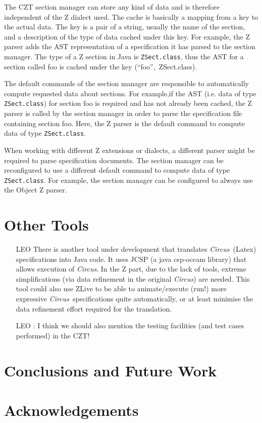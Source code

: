 \documentclass{llncs}
\newcommand{\Circus}{{\sf\slshape Circus}}
\newcommand{\Interface}[1]{\texttt{#1}}
\begin{document}
  The CZT section manager can store any kind of data and is therefore
  independent of the Z dialect used.  The cache is basically a mapping
  from a key to the actual data.  The key is a pair of a string,
  usually the name of the section, and a description of the type of
  data cached under this key.  For example, the Z parser adds the AST
  representation of a specification it has parsed to the section
  manager.  The type of a Z section in Java is
  \Interface{ZSect.class}, thus the AST for a section called foo is
  cached under the key (``foo'',~ZSect.class).

  The default commands of the section manager are responsible to
  automatically compute requested data about sections.  For example,if
  the AST (i.e. data of type \Interface{ZSect.class}) for section foo
  is required and has not already been cached, the Z parser is called
  by the section manager in order to parse the specification file
  containing section foo.  Here, the Z parser is the default command
  to compute data of type \Interface{ZSect.class}.

  When working with different Z extensions or dialects, a different
  parser might be required to parse specification documents.  The
  section manager can be reconfigured to use a different default
  command to compute data of type \Interface{ZSect.class}.  For
  example, the section manager can be configured to always use the
  Object Z parser.

\section{Other Tools}

    \begin{itemize}
        \item[LEO]
        There is another tool under development that translates \Circus\ (Latex) specifications into Java code.
        It uses JCSP (a java csp-occam library) that allows execution of \Circus.
        In the Z part, due to the lack of tools, extreme simplifications (via data refinement in the original \Circus)
        are needed.
        This tool could also use ZLive to be able to animate/execute (run!) more expressive \Circus\ specifications quite
        automatically, or at least minimise the data refinement effort required for the translation.
    \end{itemize}

    \begin{itemize}
        \item[LEO]: I think we should also mention the testing facilities (and test cases performed) in the CZT!
    \end{itemize}

\section{Conclusions and Future Work} \label{sec:conclusions}

\section*{Acknowledgements}



\end{document}

